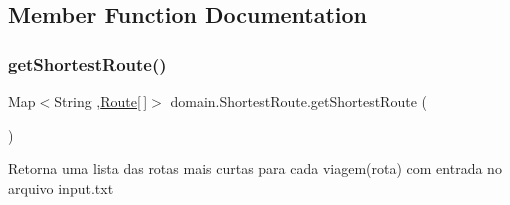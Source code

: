 \subsection{Member Function Documentation}
\mbox{\label{classdomain_1_1_shortest_route_a7ae44089b0d36ae422c678294425ed3f}} 
\subsubsection{\texorpdfstring{get\+Shortest\+Route()}{getShortestRoute()}\hspace{0.1cm}{\footnotesize\ttfamily [1/2]}}
{\footnotesize\ttfamily Map$<$String ,\hyperlink{classdomain_1_1_route}{Route}\mbox{[}$\,$\mbox{]}$>$ domain.\+Shortest\+Route.\+get\+Shortest\+Route (\begin{DoxyParamCaption}{ }\end{DoxyParamCaption})}

Retorna uma lista das rotas mais curtas para cada viagem(rota) com entrada no arquivo input.\+txt

